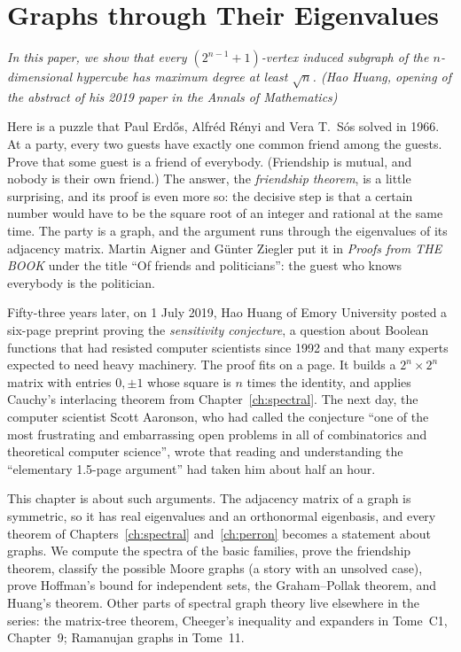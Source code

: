 \chapter{Graphs through Their Eigenvalues}\label{ch:graphs}

\begin{center}\itshape
In this paper, we show that every $(2^{n-1}+1)$-vertex induced subgraph of the $n$-dimensional hypercube has maximum degree at
least $\sqrt n$.
\upshape(Hao Huang, opening of the abstract of his 2019 paper in the \emph{Annals of Mathematics})
\end{center}

Here is a puzzle that Paul Erd\H{o}s, Alfr\'ed R\'enyi and Vera T.~S\'os solved in 1966. At a party, every two guests have
exactly one common friend among the guests. Prove that some guest is a friend of everybody. (Friendship is mutual, and
nobody is their own friend.) The answer, the \emph{friendship theorem}, is a little surprising, and its proof is even more so:
the decisive step is that a certain number would have to be the square root of an integer and rational at the same time.
The party is a graph, and the argument runs through the eigenvalues of its adjacency matrix. Martin Aigner and G\"unter
Ziegler put it in \emph{Proofs from THE BOOK} under the title ``Of friends and politicians'': the guest who knows everybody
is the politician.

Fifty-three years later, on 1 July 2019, Hao Huang of Emory University posted a six-page preprint proving the
\emph{sensitivity conjecture}, a question about Boolean functions that had resisted computer scientists since 1992 and
that many experts expected to need heavy machinery. The proof fits on a page. It builds a $2^n\times2^n$ matrix with entries
$0,\pm1$ whose square is $n$ times the identity, and applies Cauchy's interlacing theorem from Chapter~\ref{ch:spectral}.
The next day, the computer scientist Scott Aaronson, who had called the conjecture ``one of the most frustrating and
embarrassing open problems in all of combinatorics and theoretical computer science'', wrote that reading and understanding
the ``elementary 1.5-page argument'' had taken him about half an hour.

This chapter is about such arguments. The adjacency matrix of a graph is symmetric, so it has real eigenvalues and an
orthonormal eigenbasis, and every theorem of Chapters~\ref{ch:spectral} and~\ref{ch:perron} becomes a statement about graphs.
We compute the spectra of the basic families, prove the friendship theorem, classify the possible Moore graphs (a story with
an unsolved case), prove Hoffman's bound for independent sets, the Graham--Pollak theorem, and Huang's theorem. Other parts
of spectral graph theory live elsewhere in the series: the matrix-tree theorem, Cheeger's inequality and expanders in
Tome~C1, Chapter~9; Ramanujan graphs in Tome~11.

